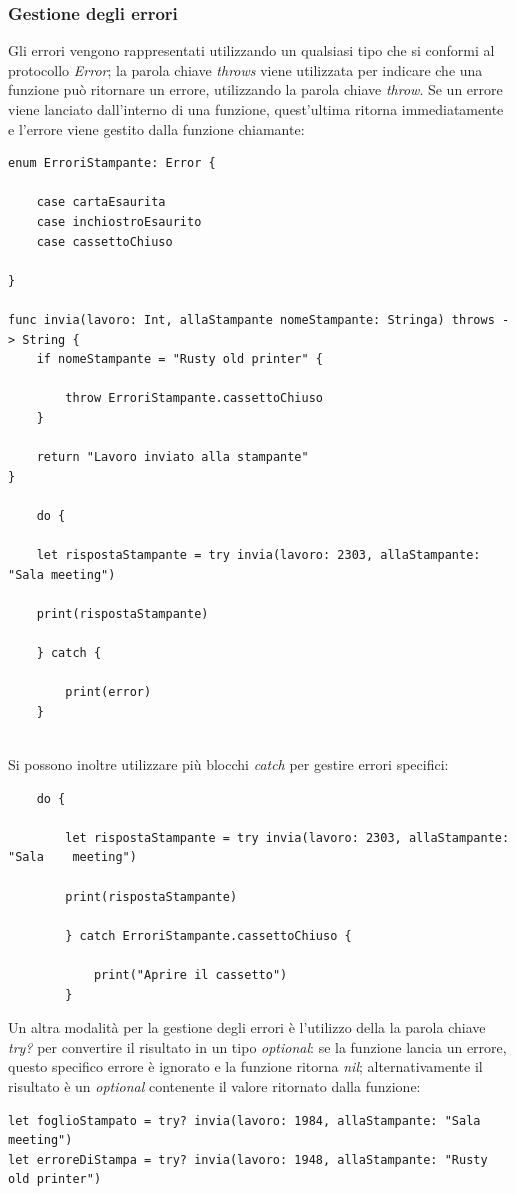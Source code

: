 \subsubsection{Gestione degli errori}
Gli errori vengono rappresentati utilizzando un qualsiasi tipo che si conformi al protocollo \textit{Error}; la parola chiave \textit{throws} viene utilizzata per indicare che una funzione può ritornare un errore, utilizzando la parola chiave \textit{throw}. Se un errore viene lanciato dall'interno di una funzione, quest'ultima ritorna immediatamente e l'errore viene gestito dalla funzione chiamante:
\lstset{language=[Objective]C, breakindent=40pt, breaklines}
\begin{lstlisting}
enum ErroriStampante: Error {

	case cartaEsaurita
	case inchiostroEsaurito
	case cassettoChiuso
	
}

func invia(lavoro: Int, allaStampante nomeStampante: Stringa) throws -> String {
	if nomeStampante = "Rusty old printer" {
		
		throw ErroriStampante.cassettoChiuso
	}

	return "Lavoro inviato alla stampante"
}

	do {
	
	let rispostaStampante = try invia(lavoro: 2303, allaStampante: "Sala meeting")
	
	print(rispostaStampante)
	
	} catch {
		
		print(error)
	}
	
\end{lstlisting}
Si possono inoltre utilizzare più blocchi \textit{catch} per gestire errori specifici:
\lstset{language=[Objective]C, breakindent=40pt, breaklines}
\begin{lstlisting}
	do {
	
		let rispostaStampante = try invia(lavoro: 2303, allaStampante: "Sala 	meeting")
	
		print(rispostaStampante)
	
		} catch ErroriStampante.cassettoChiuso {
		
			print("Aprire il cassetto")
		}
\end{lstlisting}
Un altra modalità per la gestione degli errori è l'utilizzo della la parola chiave \textit{try?} per convertire il risultato in un tipo \textit{optional}: se la funzione lancia un errore, questo specifico errore è ignorato e la funzione ritorna \textit{nil}; alternativamente il risultato è un \textit{optional} contenente il valore ritornato dalla funzione:
\lstset{language=[Objective]C, breakindent=40pt, breaklines}
\begin{lstlisting}
let foglioStampato = try? invia(lavoro: 1984, allaStampante: "Sala meeting")
let erroreDiStampa = try? invia(lavoro: 1948, allaStampante: "Rusty old printer")
\end{lstlisting}
